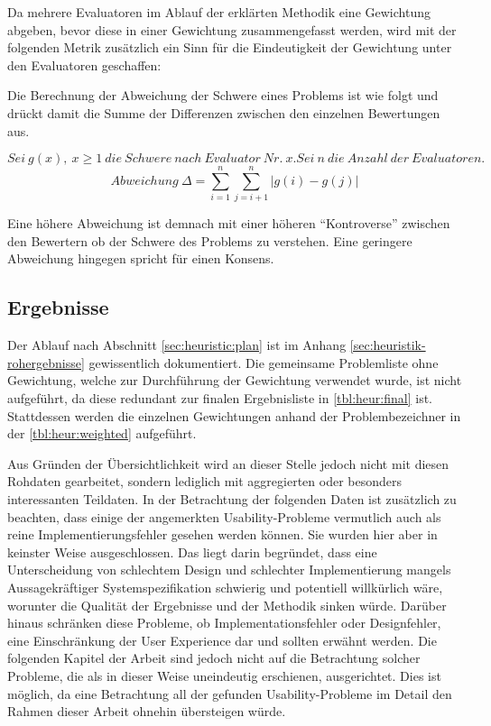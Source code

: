 \documentclass[
  12pt,
  ngerman,
  a4paper,
]{article}
\begin{document}
Da mehrere Evaluatoren im Ablauf der erklärten Methodik eine Gewichtung
abgeben, bevor diese in einer Gewichtung zusammengefasst werden, wird
mit der folgenden Metrik zusätzlich ein Sinn für die Eindeutigkeit der
Gewichtung unter den Evaluatoren geschaffen:

Die Berechnung der Abweichung der Schwere eines Problems ist wie folgt
und drückt damit die Summe der Differenzen zwischen den einzelnen
Bewertungen aus.

\[Sei~g(x),~x\geq1~die~Schwere~nach~Evaluator~Nr.~x. Sei~n~die~Anzahl~der~Evaluatoren.\]
\[Abweichung~\Delta= \sum_{i=1}^{n}{\sum_{j=i+1}^{n}{|g(i)-g(j)|}}\]

Eine höhere Abweichung ist demnach mit einer höheren ``Kontroverse''
zwischen den Bewertern ob der Schwere des Problems zu verstehen. Eine
geringere Abweichung hingegen spricht für einen Konsens.

\clearpage

\hypertarget{ergebnisse}{%
\subsection{Ergebnisse}\label{ergebnisse}}

Der Ablauf nach Abschnitt \ref{sec:heuristic:plan} ist im Anhang
\ref{sec:heuristik-rohergebnisse} gewissentlich dokumentiert. Die
gemeinsame Problemliste ohne Gewichtung, welche zur Durchführung der
Gewichtung verwendet wurde, ist nicht aufgeführt, da diese redundant zur
finalen Ergebnisliste in \cref{tbl:heur:final} ist. Stattdessen werden
die einzelnen Gewichtungen anhand der Problembezeichner in der
\cref{tbl:heur:weighted} aufgeführt.

Aus Gründen der Übersichtlichkeit wird an dieser Stelle jedoch nicht mit
diesen Rohdaten gearbeitet, sondern lediglich mit aggregierten oder
besonders interessanten Teildaten. In der Betrachtung der folgenden
Daten ist zusätzlich zu beachten, dass einige der angemerkten
Usability-Probleme vermutlich auch als reine Implementierungsfehler
gesehen werden können. Sie wurden hier aber in keinster Weise
ausgeschlossen. Das liegt darin begründet, dass eine Unterscheidung von
schlechtem Design und schlechter Implementierung mangels
Aussagekräftiger Systemspezifikation schwierig und potentiell
willkürlich wäre, worunter die Qualität der Ergebnisse und der Methodik
sinken würde. Darüber hinaus schränken diese Probleme, ob
Implementationsfehler oder Designfehler, eine Einschränkung der User
Experience dar und sollten erwähnt werden. Die folgenden Kapitel der
Arbeit sind jedoch nicht auf die Betrachtung solcher Probleme, die als
in dieser Weise uneindeutig erschienen, ausgerichtet. Dies ist möglich,
da eine Betrachtung all der gefunden Usability-Probleme im Detail den
Rahmen dieser Arbeit ohnehin übersteigen würde.
\end{document}
